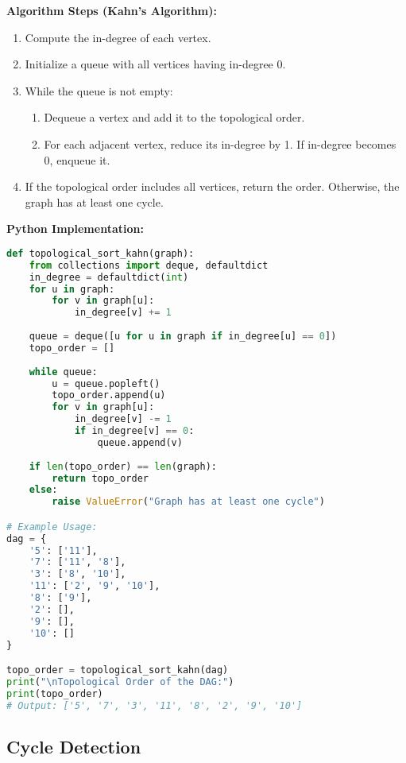 \textbf{Algorithm Steps (Kahn's Algorithm):}
\begin{enumerate}
    \item Compute the in-degree of each vertex.
    \item Initialize a queue with all vertices having in-degree 0.
    \item While the queue is not empty:
    \begin{enumerate}
        \item Dequeue a vertex and add it to the topological order.
        \item For each adjacent vertex, reduce its in-degree by 1. If in-degree becomes 0, enqueue it.
    \end{enumerate}
    \item If the topological order includes all vertices, return the order. Otherwise, the graph has at least one cycle.
\end{enumerate}

\textbf{Python Implementation:}

\begin{lstlisting}[language=Python, xleftmargin=0.02\textwidth, xrightmargin=0.02\textwidth]
def topological_sort_kahn(graph):
    from collections import deque, defaultdict
    in_degree = defaultdict(int)
    for u in graph:
        for v in graph[u]:
            in_degree[v] += 1
    
    queue = deque([u for u in graph if in_degree[u] == 0])
    topo_order = []
    
    while queue:
        u = queue.popleft()
        topo_order.append(u)
        for v in graph[u]:
            in_degree[v] -= 1
            if in_degree[v] == 0:
                queue.append(v)
    
    if len(topo_order) == len(graph):
        return topo_order
    else:
        raise ValueError("Graph has at least one cycle")

# Example Usage:
dag = {
    '5': ['11'],
    '7': ['11', '8'],
    '3': ['8', '10'],
    '11': ['2', '9', '10'],
    '8': ['9'],
    '2': [],
    '9': [],
    '10': []
}

topo_order = topological_sort_kahn(dag)
print("\nTopological Order of the DAG:")
print(topo_order)
# Output: ['5', '7', '3', '11', '8', '2', '9', '10']
\end{lstlisting}

\subsection{Cycle Detection}

